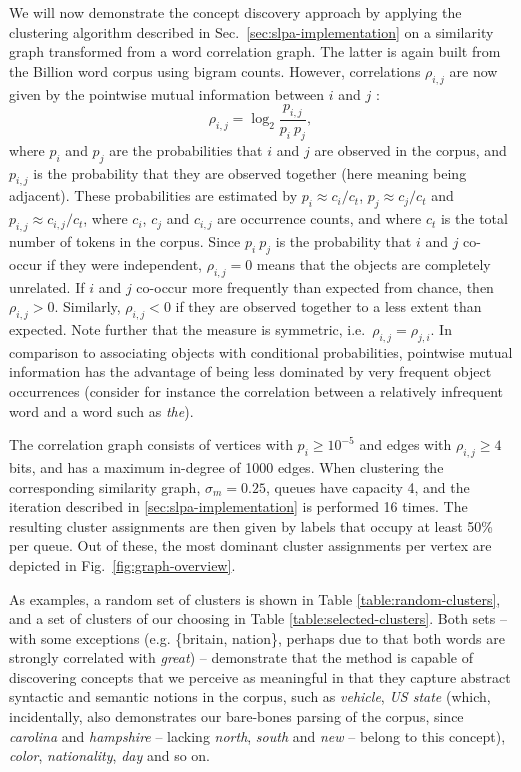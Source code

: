 \documentclass{kais}
\newcommand{\rn}[1]{\rho_{#1}}
\begin{document}
We will now demonstrate the concept discovery approach by applying the clustering algorithm described in 
Sec.~\ref{sec:slpa-implementation} on a similarity graph transformed from a word correlation graph.
The latter is again built from the Billion word corpus using bigram counts. However, correlations $\rn{i,j}$
are now given by the pointwise mutual information between $i$ and $j$ \cite{Church90}:
\begin{equation}
\rn{i,j} = \log_2 \frac{p_{i,j}}{p_i\ p_j},
\end{equation}
where $p_i$ and $p_j$ are the probabilities that $i$ and $j$ are observed in the corpus, and $p_{i,j}$ is the probability
that they are observed together (here meaning being adjacent). 
These probabilities are estimated by $p_i \approx c_i / c_{t}$, $p_j \approx c_j / c_{t}$ and
$p_{i,j} \approx c_{i,j} / c_{t}$, where $c_i$, $c_j$ and $c_{i,j}$ are occurrence counts, and where $c_{t}$ is the total number
of tokens in the corpus. Since $p_i\ p_j$ is the probability that $i$ and $j$ co-occur if they were independent, 
$\rn{i,j} = 0$ means that the objects are completely unrelated. If 
$i$ and $j$ co-occur more frequently than expected from chance, then $\rn{i,j} > 0$. Similarly, $\rn{i,j} < 0$ if they 
are observed together to a less extent than expected. Note further that the measure is symmetric, i.e.~$\rn{i,j} = \rn{j,i}$.
In comparison to associating objects with conditional probabilities,
pointwise mutual information has the advantage of being less dominated by very frequent object occurrences (consider for
instance the correlation between a relatively infrequent word and a word such as \emph{the}).

The correlation graph consists of vertices with $p_i \geq 10^{-5}$ and edges with $\rn{i,j} \geq 4$ bits, and has 
a maximum in-degree of 1000 edges. When clustering the corresponding similarity graph, 
$\sigma_m = 0.25$, queues have capacity 4, and the iteration described in \ref{sec:slpa-implementation} is performed 16 times. 
The resulting cluster assignments are then given by labels that occupy at least 50\% per queue. Out of these, the most 
dominant cluster assignments per vertex are depicted in Fig.~\ref{fig:graph-overview}.

As examples, a random set of clusters is shown in Table \ref{table:random-clusters}, and a set of clusters of our choosing in Table \ref{table:selected-clusters}. Both sets -- with some exceptions (e.g. \{britain, nation\}, perhaps due to that both
words are strongly correlated with \emph{great}) -- demonstrate that the method is capable of discovering 
concepts that we perceive as meaningful in that they capture abstract syntactic and semantic notions in the corpus, such as
\emph{vehicle}, \emph{US state} (which, incidentally, also demonstrates our bare-bones parsing of the corpus,
since \emph{carolina} and \emph{hampshire} -- lacking \emph{north}, \emph{south} and \emph{new} -- belong to this concept),
\emph{color}, \emph{nationality}, \emph{day} and so on.
\end{document}
